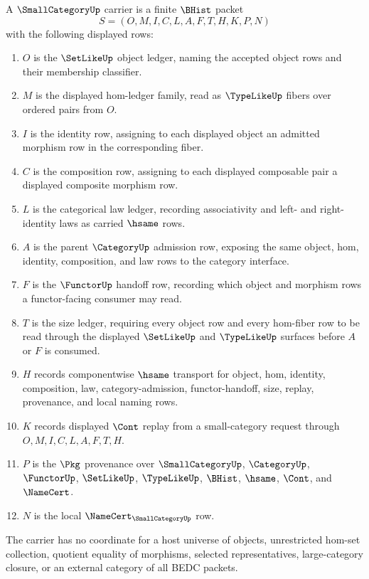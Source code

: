\begin{definition}
\label{def:small-category-carrier}
A $\SmallCategoryUp$ carrier is a finite $\BHist$ packet
$$
S=(O,M,I,C,L,A,F,T,H,K,P,N)
$$
with the following displayed rows:
\begin{enumerate}
\item $O$ is the $\SetLikeUp$ object ledger, naming the accepted object rows and their membership classifier.
\item $M$ is the displayed hom-ledger family, read as $\TypeLikeUp$ fibers over ordered pairs from $O$.
\item $I$ is the identity row, assigning to each displayed object an admitted morphism row in the corresponding fiber.
\item $C$ is the composition row, assigning to each displayed composable pair a displayed composite morphism row.
\item $L$ is the categorical law ledger, recording associativity and left- and right-identity laws as carried $\hsame$ rows.
\item $A$ is the parent $\CategoryUp$ admission row, exposing the same object, hom, identity, composition, and law rows to the category interface.
\item $F$ is the $\FunctorUp$ handoff row, recording which object and morphism rows a functor-facing consumer may read.
\item $T$ is the size ledger, requiring every object row and every hom-fiber row to be read through the displayed $\SetLikeUp$ and $\TypeLikeUp$ surfaces before $A$ or $F$ is consumed.
\item $H$ records componentwise $\hsame$ transport for object, hom, identity, composition, law, category-admission, functor-handoff, size, replay, provenance, and local naming rows.
\item $K$ records displayed $\Cont$ replay from a small-category request through $O,M,I,C,L,A,F,T,H$.
\item $P$ is the $\Pkg$ provenance over $\SmallCategoryUp$, $\CategoryUp$, $\FunctorUp$, $\SetLikeUp$, $\TypeLikeUp$, $\BHist$, $\hsame$, $\Cont$, and $\NameCert$.
\item $N$ is the local $\NameCert_{\SmallCategoryUp}$ row.
\end{enumerate}
The carrier has no coordinate for a host universe of objects, unrestricted hom-set collection, quotient equality of morphisms, selected representatives, large-category closure, or an external category of all BEDC packets.
\end{definition}

